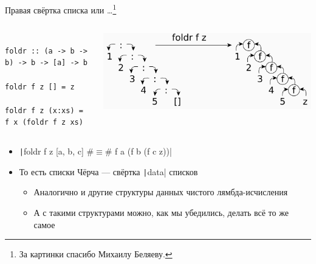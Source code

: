     \begin{frame}[fragile]{Правая свёртка списка или \ldots\footnote{За картинки спасибо Михаилу Беляеву.}}
        \vspace{-1em}
        \begin{columns}[onlytextwidth]
            \begin{column}{0.485\textwidth}
                \begin{verbatim}
                    foldr :: (a -> b -> b) -> b -> [a] -> b
                    foldr f z [] = z
                    foldr f z (x:xs) = f x (foldr f z xs)
                \end{verbatim}
            \end{column}\hfill%
            \begin{column}{0.5\textwidth}
                \begin{center}
                    \includegraphics[width=1\textwidth]{figs/foldr}
                \end{center}
            \end{column}
        \end{columns}
        \vspace{0.5em}
        \begin{itemize}
            \item[\eg] \texttt|foldr f z [a, b, c] #$\equiv$# f a (f b (f c z))|
            \item[\then] То есть списки Чёрча --- свёртка \texttt|data| списков
            \begin{itemize}
                \item Аналогично и другие структуры данных чистого лямбда-исчисления
                \item А с такими структурами можно, как мы убедились, делать всё то же самое
            \end{itemize}
        \end{itemize}
    \end{frame}

